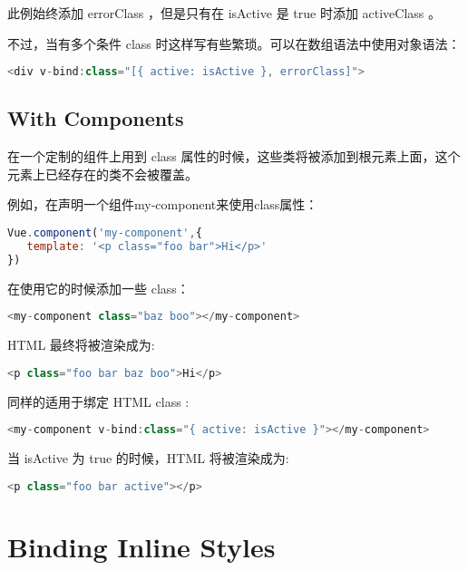 此例始终添加 errorClass ，但是只有在 isActive 是 true 时添加 activeClass 。

不过，当有多个条件 class 时这样写有些繁琐。可以在数组语法中使用对象语法：

\begin{lstlisting}[language=JavaScript]
<div v-bind:class="[{ active: isActive }, errorClass]">
\end{lstlisting}




\subsection{With Components}

在一个定制的组件上用到 class 属性的时候，这些类将被添加到根元素上面，这个元素上已经存在的类不会被覆盖。

例如，在声明一个组件my-component来使用class属性：

\begin{lstlisting}[language=JavaScript]
Vue.component('my-component',{
   template: '<p class="foo bar">Hi</p>'
})
\end{lstlisting}

在使用它的时候添加一些 class：

\begin{lstlisting}[language=JavaScript]
<my-component class="baz boo"></my-component>
\end{lstlisting}

HTML 最终将被渲染成为:


\begin{lstlisting}[language=JavaScript]
<p class="foo bar baz boo">Hi</p>
\end{lstlisting}

同样的适用于绑定 HTML class :

\begin{lstlisting}[language=JavaScript]
<my-component v-bind:class="{ active: isActive }"></my-component>
\end{lstlisting}

当 isActive 为 true 的时候，HTML 将被渲染成为:


\begin{lstlisting}[language=JavaScript]
<p class="foo bar active"></p>
\end{lstlisting}








\section{Binding Inline Styles}



